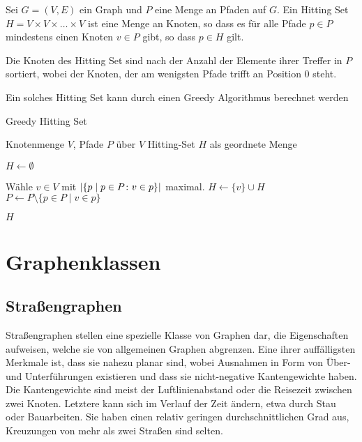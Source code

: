 \begin{definition}
    Sei $G = (V, E)$ ein Graph und $P$ eine Menge an Pfaden auf $G$.
    Ein Hitting Set $H = V \times V \times \dotsc \times V$ ist eine Menge an Knoten, so dass es für alle Pfade $p \in P$ mindestens einen Knoten $v \in P$ gibt, so dass $p \in H$ gilt.

    Die Knoten des Hitting Set sind nach der Anzahl der Elemente ihrer Treffer in $P$ sortiert, wobei der Knoten, der am wenigsten Pfade trifft an Position 0 steht.
\end{definition}

Ein solches Hitting Set kann durch einen Greedy Algorithmus berechnet werden

\begin{algorithm}
    \caption{Greedy Hitting Set}
    \begin{algorithmic}[1]
        \Require Knotenmenge $V$, Pfade $P$ über $V$
        \Ensure Hitting-Set $H$ als geordnete Menge

        \State $H \gets \emptyset$

        \State

        \State Wähle $v \in V$ mit $\abs{ \{ p \mid p \in P \colon v \in p \}}$ maximal.
        \State $H \gets \{v\} \cup H$
        \State $P \gets P \setminus \{p \in P \mid v \in p\}$
        \EndWhile

        \State

        \State \Return $H$
    \end{algorithmic}
\end{algorithm}


\section{Graphenklassen}
\subsection{Straßengraphen}\label{graphs:strassengraphen}

Straßengraphen stellen eine spezielle Klasse von Graphen dar, die  Eigenschaften aufweisen, welche sie von allgemeinen Graphen abgrenzen.
Eine ihrer auffälligsten Merkmale ist, dass sie nahezu planar sind, wobei Ausnahmen in Form von Über- und Unterführungen existieren und dass sie nicht-negative Kantengewichte haben.
Die Kantengewichte sind meist der Luftlinienabstand oder die Reisezeit zwischen zwei Knoten.
Letztere kann sich im Verlauf der Zeit ändern, etwa durch Stau oder Bauarbeiten.
Sie haben einen relativ geringen durchschnittlichen Grad aus, Kreuzungen von mehr als zwei Straßen sind selten.

